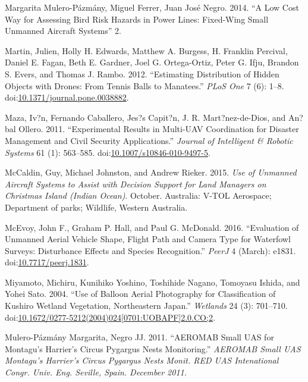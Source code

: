 \documentclass[]{interact}
\theoremstyle{plain}%
\theoremstyle{definition}
\theoremstyle{remark}
\begin{document}
\hypertarget{ref-margarita_mulero-pazmany_juan_jose_negro_low_2014}{}
Margarita Mulero-Pázmány, Miguel Ferrer, Juan José Negro. 2014. ``A Low
Cost Way for Assessing Bird Risk Hazards in Power Lines: Fixed-Wing
Small Unmanned Aircraft Systems'' 2.

\hypertarget{ref-martin_estimating_2012}{}
Martin, Julien, Holly H. Edwards, Matthew A. Burgess, H. Franklin
Percival, Daniel E. Fagan, Beth E. Gardner, Joel G. Ortega-Ortiz, Peter
G. Ifju, Brandon S. Evers, and Thomas J. Rambo. 2012. ``Estimating
Distribution of Hidden Objects with Drones: From Tennis Balls to
Manatees.'' \emph{PLoS One} 7 (6): 1--8.
doi:\href{https://doi.org/10.1371/journal.pone.0038882}{10.1371/journal.pone.0038882}.

\hypertarget{ref-maza_experimental_2011}{}
Maza, Iv?n, Fernando Caballero, Jes?s Capit?n, J. R. Mart?nez-de-Dios,
and An?bal Ollero. 2011. ``Experimental Results in Multi-UAV
Coordination for Disaster Management and Civil Security Applications.''
\emph{Journal of Intelligent \& Robotic Systems} 61 (1): 563--585.
doi:\href{https://doi.org/10.1007/s10846-010-9497-5}{10.1007/s10846-010-9497-5}.

\hypertarget{ref-mccaldin_use_2015}{}
McCaldin, Guy, Michael Johnston, and Andrew Rieker. 2015. \emph{Use of
Unmanned Aircraft Systems to Assist with Decision Support for Land
Managers on Christmas Island (Indian Ocean)}. October. Australia: V-TOL
Aerospace; Department of parks; Wildlife, Western Australia.

\hypertarget{ref-mcevoy_evaluation_2016}{}
McEvoy, John F., Graham P. Hall, and Paul G. McDonald. 2016.
``Evaluation of Unmanned Aerial Vehicle Shape, Flight Path and Camera
Type for Waterfowl Surveys: Disturbance Effects and Species
Recognition.'' \emph{PeerJ} 4 (March): e1831.
doi:\href{https://doi.org/10.7717/peerj.1831}{10.7717/peerj.1831}.

\hypertarget{ref-miyamoto_use_2004}{}
Miyamoto, Michiru, Kunihiko Yoshino, Toshihide Nagano, Tomoyasu Ishida,
and Yohei Sato. 2004. ``Use of Balloon Aerial Photography for
Classification of Kushiro Wetland Vegetation, Northeastern Japan.''
\emph{Wetlands} 24 (3): 701--710.
doi:\href{https://doi.org/10.1672/0277-5212(2004)024\%5B0701:UOBAPF\%5D2.0.CO;2}{10.1672/0277-5212(2004)024{[}0701:UOBAPF{]}2.0.CO;2}.

\hypertarget{ref-mulero-pazmany_margarita_aeromab_2011}{}
Mulero-Pázmány Margarita, Negro JJ. 2011. ``AEROMAB Small UAS for
Montagu's Harrier's Circus Pygargus Nests Monitoring.'' \emph{AEROMAB
Small UAS Montagu's Harrier's Circus Pygargus Nests Monit. RED UAS
Intenational Congr. Univ. Eng. Seville, Spain. December 2011.}
\end{document}
